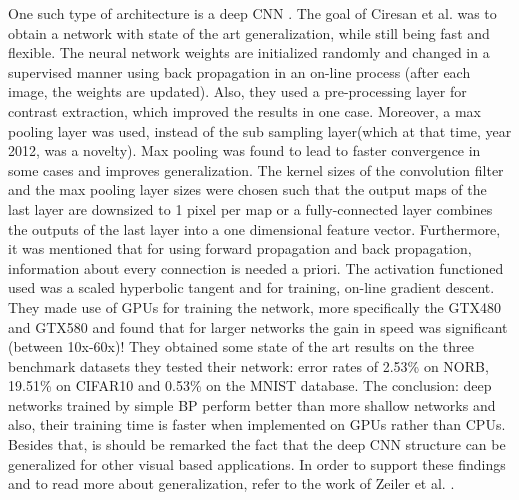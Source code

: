 \documentclass[12pt,a4paper,twoside]{report}
\begin{document}
One such type of architecture is a deep CNN \cite{article-ciresan}. The goal of Ciresan et al. was to obtain a network with state of the art generalization, while still being fast and flexible. The neural network weights are initialized randomly and changed in a supervised manner using back propagation in an on-line process (after each image, the weights are updated). Also, they used a pre-processing layer for contrast extraction, which improved the results in one case. Moreover, a max pooling layer was used, instead of the sub sampling layer(which at that time, year 2012, was a novelty). Max pooling was found to lead to faster convergence in some cases and improves generalization. The kernel sizes of the convolution filter and the max pooling layer sizes were chosen such that the output maps of the last layer are downsized to 1 pixel per map or a fully-connected layer combines the outputs of the last layer into a one dimensional feature vector. Furthermore, it was mentioned that for using forward propagation and back propagation, information about every connection is needed a priori. The activation functioned used was a scaled hyperbolic tangent and for training, on-line gradient descent. They made use of GPUs for training the network, more specifically the GTX480 and GTX580 and found that for larger networks the gain in speed was significant (between 10x-60x)! They obtained some state of the art results on the three benchmark datasets they tested their network: error rates of 2.53\% on NORB, 19.51\% on CIFAR10 and 0.53\% on the MNIST database. The conclusion: deep networks trained by simple BP perform better than more shallow networks and also, their training time is faster when implemented on GPUs rather than CPUs. Besides that, is should be remarked the fact that the deep CNN structure can be generalized for other visual based applications. In order to support these findings and to read more about generalization, refer to the work of Zeiler et al. \cite{article-understandingcnn}.\par
\end{document}
